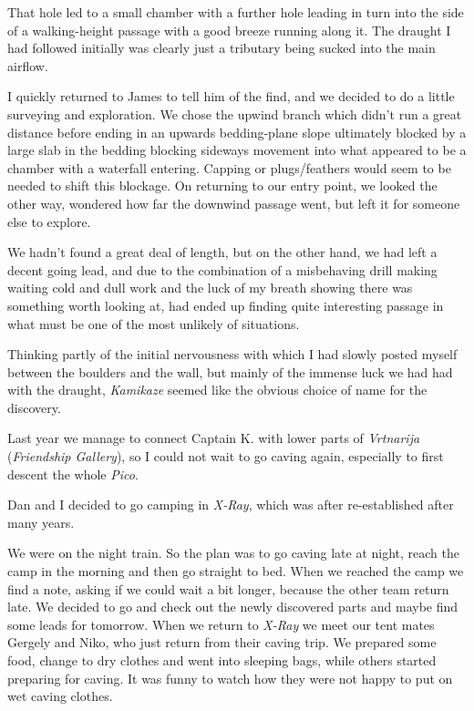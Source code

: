 That hole led to a small chamber with a further hole leading in turn
into the side of a walking-height passage with a good breeze running
along it. The draught I had followed initially was clearly just a
tributary being sucked into the main airflow.

I quickly returned to James to tell him of the find, and we decided to
do a little surveying and exploration. We chose the upwind branch which
didn't run a great distance before ending in an upwards bedding-plane
slope ultimately blocked by a large slab in the bedding blocking
sideways movement into what appeared to be a chamber with a waterfall
entering. Capping or plugs/feathers would seem to be needed to shift
this blockage. On returning to our entry point, we looked the other way,
wondered how far the downwind passage went, but left it for someone else
to explore.

We hadn't found a great deal of length, but on the other hand, we had
left a decent going lead, and due to the combination of a misbehaving
drill making waiting cold and dull work and the luck of my breath
showing there was something worth looking at, had ended up finding quite
interesting passage in what must be one of the most unlikely of
situations.

Thinking partly of the initial nervousness with which I had slowly
posted myself between the boulders and the wall, but mainly of the
immense luck we had had with the draught, \emph{Kamikaze} seemed like
the obvious choice of name for the discovery.


Last year we manage to connect Captain K. with lower parts of
\emph{Vrtnarija} (\emph{Friendship Gallery}), so I could not wait to go
caving again, especially to first descent the whole \emph{Pico}.

Dan and I decided to go camping in \emph{X-Ray}, which was after
re-established after many years.

We were on the night train. So the plan was to go caving late at night,
reach the camp in the morning and then go straight to bed. When we
reached the camp we find a note, asking if we could wait a bit longer,
because the other team return late. We decided to go and check out the
newly discovered parts and maybe find some leads for tomorrow. When we
return to \emph{X-Ray} we meet our tent mates Gergely and Niko, who just
return from their caving trip. We prepared some food, change to dry
clothes and went into sleeping bags, while others started preparing for
caving. It was funny to watch how they were not happy to put on wet
caving clothes.

